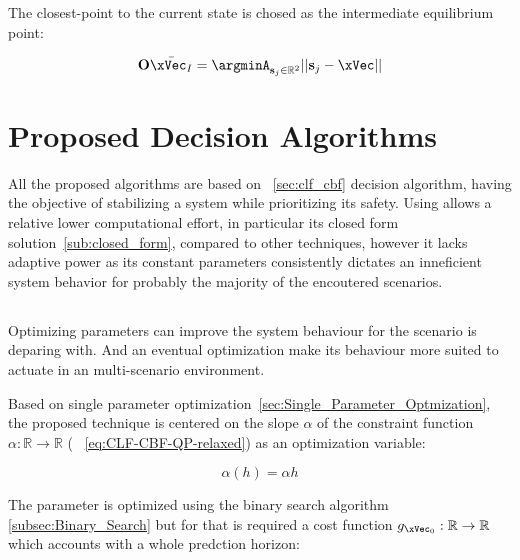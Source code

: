 The closest-point to the current state is chosed as the intermediate equilibrium point:

\begin{equation}
    \mathbf{O}\bar{\xVec_I} = \argminA_{\mathbf{s}_j \in \mathbb{R}^2} ||\mathbf{s}_j - \xVec|| 
    \label{eq:Intermediate_Equilibrium_Point}
\end{equation}



\newpage %


\section{Proposed Decision Algorithms}
\label{sec:Proposed_Decision_Algorithms}

All the proposed algorithms are based on ~\ref{sec:clf_cbf} decision algorithm, having the objective of stabilizing a system while prioritizing its safety. Using  allows a relative lower computational effort, in particular its closed form solution~\ref{sub:closed_form}, compared to other techniques, however it lacks adaptive power as its constant parameters consistently dictates an inneficient system behavior for probably the majority of the encoutered scenarios. \\    


\subsection{}
\label{subsec:Just_Optimized_Algorithm}

Optimizing parameters can improve the system behaviour for the scenario is deparing with. And an eventual optimization make its behaviour more suited to actuate in an multi-scenario environment. \par
Based on single parameter optimization~\ref{sec:Single_Parameter_Optmization}, the proposed technique is centered on the slope \(\alpha\) of the  constraint function \(\alpha:\mathbb{R} \to \mathbb{R}\) ( ~\ref{eq:CLF-CBF-QP-relaxed}) as an optimization variable:

\begin{equation}
    \alpha(h) = \alpha h
    \label{eq:CBF_Alpha_Formulation_AJO}
\end{equation}

The parameter is optimized using the binary search algorithm \ref{subsec:Binary_Search} but for that is required a cost function \(g_{\xVec_0}:\mathbb{R} \to \mathbb{R}\) which accounts with a whole predction horizon:

